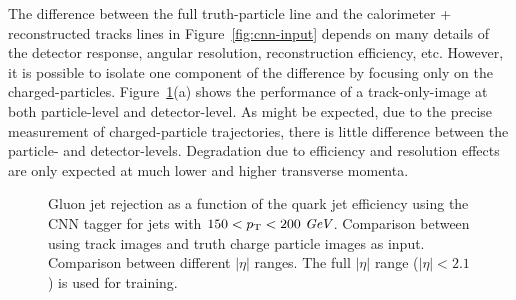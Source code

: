 The difference between the full truth-particle line and the calorimeter + reconstructed tracks lines in Figure~\ref{fig:cnn-input} 
depends on many details of the detector response, angular resolution, reconstruction efficiency, etc.  
However, it is possible to isolate one component of the difference by focusing only on the charged-particles.  Figure~\ref{fig:cnn-tracktruth}(a) shows the performance of a track-only-image at both particle-level and detector-level.  As might be expected, due to the precise measurement of charged-particle trajectories, there is little difference between the particle- and detector-levels.  Degradation due to efficiency and resolution effects are only expected at much lower and higher transverse momenta.

\begin{figure}[htpb]
\begin{center}
\caption{Gluon jet rejection as a function of the quark jet efficiency using the CNN tagger for jets with $150<p_{{\rm T}}<200~\textit{GeV}$.
\protect{} Comparison between using track images and truth charge particle images as input.
\protect{} Comparison between different $|\eta|$ ranges. The full $|\eta|$ range ($|\eta|<2.1$) is used for training.}
\label{fig:cnn-tracktruth}
\end{center}
\end{figure}

